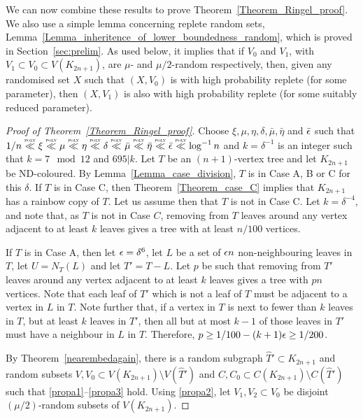 We can now combine these results to prove Theorem~\ref{Theorem_Ringel_proof}. We also use a simple lemma concerning replete random sets, Lemma~\ref{Lemma_inheritence_of_lower_boundedness_random}, which is proved in Section~\ref{sec:prelim}. As used below, it implies that if $V_0$ and $V_1$, with $V_1\subset V_0\subset V(K_{2n+1})$, are $\mu$- and $\mu/2$-random respectively, then, given any randomised set $X$ such that $(X,V_0)$ is with high probability replete (for some parameter), then $(X,V_1)$ is also with high probability replete (for some suitably reduced parameter).\begin{proof}[Proof of Theorem~\ref{Theorem_Ringel_proof}]
Choose $\xi, \mu,\eta,\delta,\bar{\mu},\bar{\eta}$ and $\bar{\epsilon}$ such that $1/n \ll\xi \ll\mu\ll \eta\ll \delta\ll\bar{\mu}\ll\bar{\eta}\ll\bar{\eps} \ll\log^{-1} n$ and $k=\delta^{-1}$ is an integer such that $k = 7\mod 12$ and $695|k$. Let $T$ be an $(n+1)$-vertex tree and let $K_{2n+1}$ be ND-coloured.
By Lemma~\ref{Lemma_case_division}, $T$ is in Case A, B or C for this $\delta$. If $T$ is in Case C, then Theorem~\ref{Theorem_case_C} implies that $K_{2n+1}$ has a rainbow copy of $T$. Let us assume then that $T$ is not in Case C. Let $k=\delta^{-4}$, and note that, as $T$ is not in Case $C$, removing from $T$ leaves around any vertex adjacent to at least $k$ leaves gives a tree with at least $n/100$ vertices.

If $T$ is in Case A, then let $\epsilon=\delta^6$, let $L$ be a set of $\epsilon n$ non-neighbouring leaves in $T$, let $U=N_T(L)$ and let $T'=T-L$. Let $p$ be such that removing from $T'$ leaves around any vertex adjacent to at least $k$ leaves gives a tree with $pn$ vertices. Note that each leaf of $T'$ which is not a leaf of $T$ must be adjacent to a vertex in $L$ in $T$. Note further that, if a vertex in $T$ is next to fewer than $k$ leaves in $T$, but at least $k$ leaves in $T'$, then all but at most $k-1$ of those leaves in $T'$ must have a neighbour in $L$ in $T$. Therefore, $p\geq 1/100-(k+1)\epsilon\geq 1/200$.

By Theorem~\ref{nearembedagain}, there is a random subgraph $\hat{T}'\subset K_{2n+1}$ and random subsets $V,V_0\subset V(K_{2n+1})\setminus V(\hat{T}')$ and $C,C_0\subset C(K_{2n+1})\setminus C(\hat{T}')$ such that \ref{propa1}--\ref{propa3} hold.
Using \ref{propa2}, let $V_1,V_2\subset V_0$ be disjoint $(\mu/2)$-random subsets of $V(K_{2n+1})$.


\end{proof}
